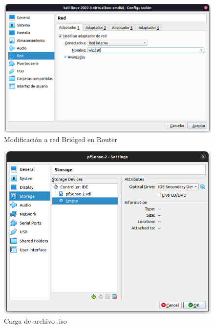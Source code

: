 \documentclass{article}
\begin{document}
        \begin{figure}[!htbp]
            \centering
            \includegraphics[scale=0.3]{img/pfsense-bridged-adapter.png}
            \caption{Modificación a red Bridged en Router}
            \label{fig:pfsense-bridged-adapter}
        \end{figure}

        \begin{figure}[!htbp]
            \centering
            \includegraphics[scale=0.3]{img/pfsense-iso-load.png}
            \caption{Carga de archivo .iso}
            \label{fig:pfsense-iso-load}
        \end{figure}
\end{document}

